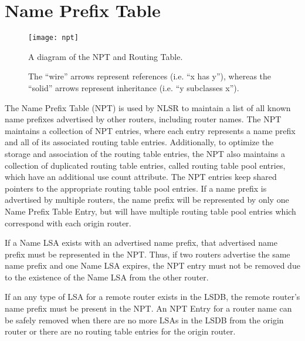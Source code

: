 \section{Name Prefix Table}
\label{sec:npt}

\begin{figure}[!h]
  \center
  \texttt{[image: npt]}
  \begin{caption}
    A diagram of the NPT and Routing Table.

    \begin{footnotesize}
      The ``wire'' arrows represent references (i.e. ``x has y''),
      whereas the ``solid'' arrows represent inheritance (i.e. ``y subclasses x'').
    \end{footnotesize}
  \end{caption}
  \label{fig:npt-class-diagram}
\end{figure}

The Name Prefix Table (NPT) is used by NLSR to maintain a list of all known name prefixes advertised by other routers, including router names.
The NPT maintains a collection of NPT entries, where each entry represents a name prefix and all of its associated routing table entries.
Additionally, to optimize the storage and association of the routing table entries, the NPT also maintains a collection of duplicated routing table entries, called routing table pool entries, which have an additional use count attribute.
The NPT entries keep shared pointers to the appropriate routing table pool entries.
If a name prefix is advertised by multiple routers, the name prefix will be represented by only one Name Prefix Table Entry, but will have multiple routing table pool entries  which correspond with each origin router.

If a Name LSA exists with an advertised name prefix, that advertised name prefix must be represented in the NPT.
Thus, if two routers advertise the same name prefix and one Name LSA expires, the NPT entry must not be removed due to the existence of the Name LSA from the other router.

If an any type of LSA for a remote router exists in the LSDB, the remote router's name prefix must be present in the NPT.
An NPT Entry for a router name can be safely removed when there are no more LSAs in the LSDB from the origin router or there are no routing table entries for the origin router.

